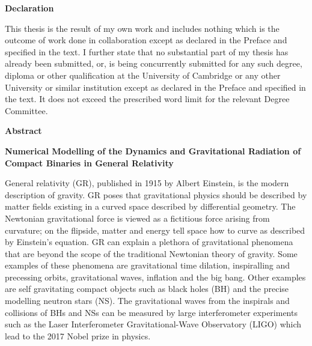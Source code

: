 \documentclass[11pt]{report}  %
\numberwithin{equation}{section}
\begin{document}
\begin{center}{\LARGE \bfseries{Declaration}}\end{center}

\vspace{2cm}

This thesis is the result of my own work and includes nothing which is the outcome of work done in collaboration except as declared in the Preface and specified in the text. I further state that no substantial part of my thesis has already been submitted, or, is being concurrently submitted for any such degree, diploma or other qualification at the University of Cambridge or any other University or similar institution except as declared in the Preface and specified in the text. It does not exceed the prescribed word limit for the relevant Degree Committee. 

\vspace{2cm}



\newpage

{\Huge \centering \bfseries Abstract \par} 

\vspace{2cm}

{\large \bfseries Numerical Modelling of the Dynamics and Gravitational Radiation of Compact Binaries in General Relativity \par} \vspace{1cm}

General relativity (GR), published in 1915 by Albert Einstein, is the modern description of gravity. GR poses that gravitational physics should be described by matter fields existing in a curved space described by differential geometry. The Newtonian gravitational force is viewed as a fictitious force arising from curvature; on the flipside, matter and energy tell space how to curve as described by Einstein's equation. GR can explain a plethora of gravitational phenomena that are beyond the scope of the traditional Newtonian theory of gravity. Some examples of these phenomena are gravitational time dilation, inspiralling and precessing orbits, gravitational waves, inflation and the big bang. Other examples are self gravitating compact objects such as black holes (BH) and the precise modelling neutron stars (NS). The gravitational waves from the inspirals and collisions of BHs and NSs can be measured by large interferometer experiments such as the Laser Interferometer Gravitational-Wave Observatory (LIGO) which lead to the 2017 Nobel prize in physics.
\end{document}
